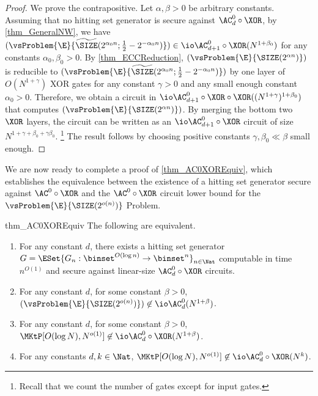 \documentclass{toc}
\begin{document}
\begin{proof}
  We prove the contrapositive.
  Let $\alpha, \beta > 0$ be arbitrary constants.
  Assuming that no hitting set generator is secure against $\AC^0_d \circ \XOR$,
  by \cref{thm_GeneralNW}, we have
  $(\vsProblem{\E}{\widetilde{\SIZE} (2^{\alpha_0 n} ; \frac{1}{2} - 2^{- \alpha_0 n})}) \in \io \AC^0_{d+1} \circ \XOR (N^{1 + \beta_0})$
  for any constants $\alpha_0, \beta_0 > 0$.
  By \cref{thm_ECCReduction},
  $(\vsProblem{\E}{{\SIZE}(2^{\alpha n})})$
  is reducible to
  $(\vsProblem{\E}{\widetilde{\SIZE}(2^{\alpha_0 n}; \frac{1}{2} - 2^{-\alpha_0 n})})$
  by one layer of $O(N^{1 + \gamma})$ XOR gates
  for any constant $\gamma > 0$ and any small enough constant $\alpha_0 > 0$.
  Therefore,
  we obtain
  a circuit in $\io\AC^0_{d+1} \circ \XOR \circ \XOR((N^{1 + \gamma})^{1 + \beta_0})$
  that computes
  $(\vsProblem{\E}{{\SIZE}(2^{\alpha n})})$.
  By merging the bottom two $\XOR$ layers,
  the circuit can be written as an $\io\AC^0_{d+1} \circ \XOR$ circuit of size $N^{1 + \gamma + \beta_0 + \gamma \beta_0}$.%
  \footnote{
    Recall that we count the number of gates except for input gates.
  }
  The result follows by choosing positive constants $\gamma, \beta_0 \ll \beta$ small enough.
\end{proof}

We are now ready to complete a proof of \cref{thm_AC0XOREquiv}, which establishes the equivalence between
the existence of a hitting set generator secure against $\AC^0 \circ \XOR$
and the $\AC^0 \circ \XOR$ circuit lower bound for the $\vsProblem{\E}{{\SIZE}(2^{o(n)})}$ Problem.

\begin{restatetheorem}
  {thm_AC0XOREquiv}
  The following are equivalent.
  \begin{enumerate}
    \item
          \label{item_HSGagainstAC0XORRestated}
          For any constant $d$,
          there exists a hitting set generator $G = \ESet{ G_n : \binset^{O(\log n)} \to \binset^n }_{n \in \Nat} $ computable in time $n^{O(1)}$ and secure against linear-size $\AC_d^0 \circ \XOR$ circuits.
    \item
          \label{item_EvsSIZERestated}
          For any constant $d$,
          for some constant $\beta > 0$,
          $(\vsProblem{\E}{\SIZE (2^{o(n)})}) \not\in \io\AC^0_d(N^{1 + \beta})$.
    \item
          \label{item_EvsKtRestated}
          For any constant $d$, for some constant $\beta > 0$,
          $\MKtP[O(\log N), N^{o(1)}] \not\in \io\AC^0_d \circ \XOR (N^{1 + \beta})$.
    \item
          \label{item_EvsKtLargeRestated}
          For any constants $d, k \in \Nat$,
          $\MKtP[O(\log N), N^{o(1)}] \not\in \io\AC^0_d \circ \XOR (N^k)$.
  \end{enumerate}
\end{restatetheorem}
\end{document}
